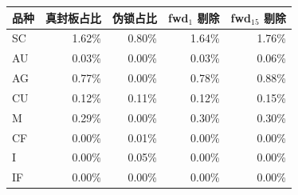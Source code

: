 \begin{tabular}{lrrrr}
\toprule
品种 & 真封板占比 & 伪锁占比 & fwd$_1$ 剔除 & fwd$_{15}$ 剔除 \\
\midrule
SC & 1.62\% & 0.80\% & 1.64\% & 1.76\% \\
AU & 0.03\% & 0.00\% & 0.03\% & 0.06\% \\
AG & 0.77\% & 0.00\% & 0.78\% & 0.88\% \\
CU & 0.12\% & 0.11\% & 0.12\% & 0.15\% \\
M & 0.29\% & 0.00\% & 0.30\% & 0.30\% \\
CF & 0.00\% & 0.01\% & 0.00\% & 0.00\% \\
I & 0.00\% & 0.05\% & 0.00\% & 0.00\% \\
IF & 0.00\% & 0.00\% & 0.00\% & 0.00\% \\
\bottomrule
\end{tabular}
